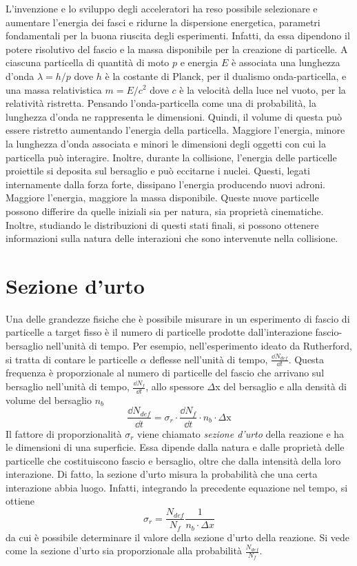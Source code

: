 \documentclass[../main.tex]{subfiles}
\begin{document}
L'invenzione e lo sviluppo degli acceleratori ha reso possibile selezionare e aumentare l'energia dei fasci e ridurne la dispersione energetica, parametri fondamentali per la buona riuscita degli esperimenti.
Infatti, da essa dipendono il potere risolutivo del fascio e la massa disponibile per la creazione di particelle.
A ciascuna particella di quantità di moto $p$ e energia $E$ è associata una lunghezza d'onda $\lambda = h / p $ dove $h$ è la costante di Planck, per il dualismo onda-particella, e una massa relativistica $m = E / c^2$ dove $c$ è la velocità della luce nel vuoto, per la relatività ristretta. 
Pensando l'onda-particella come una  di probabilità, la lunghezza d'onda ne rappresenta le dimensioni. Quindi, il volume di questa  può essere ristretto aumentando l'energia della particella. Maggiore l'energia, minore la lunghezza d'onda associata e minori le dimensioni degli oggetti con cui la particella può interagire. Inoltre, durante la collisione, l'energia delle particelle proiettile si deposita sul bersaglio e può eccitarne i nuclei. Questi, legati internamente dalla forza forte, dissipano l'energia producendo nuovi adroni. Maggiore l'energia, maggiore la massa disponibile.
Queste nuove particelle possono differire da quelle iniziali sia per natura, sia proprietà cinematiche. Inoltre, studiando le distribuzioni di questi stati finali, si possono ottenere informazioni sulla natura delle interazioni che sono intervenute nella collisione.

\section{Sezione d'urto}
Una delle grandezze fisiche che è possibile misurare in un esperimento di fascio di particelle a target fisso è il numero di particelle prodotte dall'interazione fascio-bersaglio nell'unità di tempo. Per esempio, nell'esperimento ideato da Rutherford, si tratta di contare le particelle $\alpha$ deflesse nell'unità di tempo, $\frac{\dd N_{def}}{\dd t}$. 
Questa frequenza è proporzionale al numero di particelle del fascio che arrivano sul bersaglio nell'unità di tempo, $\frac{\dd N_f}{\dd t}$, allo spessore $\Delta$x del bersaglio e alla densità di volume del bersaglio $n_b$
\begin{equation} \label{eq:def_ratio}
    \frac{\dd N_{def}}{\dd t} = \sigma_r \cdot \frac{\dd N_f}{\dd t} \cdot n_b \cdot \Delta \mathrm{x}
\end{equation}
Il fattore di proporzionalità $\sigma_r$ viene chiamato \emph{sezione d'urto} della reazione e ha le dimensioni di una superficie. Essa dipende dalla natura e dalle proprietà delle particelle che costituiscono fascio e bersaglio, oltre che dalla intensità della loro interazione. Di fatto, la sezione d'urto misura la probabilità che una certa interazione abbia luogo. Infatti, integrando la precedente equazione nel tempo, si ottiene 
\begin{equation}
    \sigma_r = \frac{N_{def}}{N_f} \frac{1}{n_b \cdot \Delta x}
\end{equation}
da cui è possibile determinare il valore della sezione d'urto della reazione. Si vede come la sezione d'urto sia proporzionale alla probabilità $\frac{N_{def}}{N_f}$.
\end{document}

